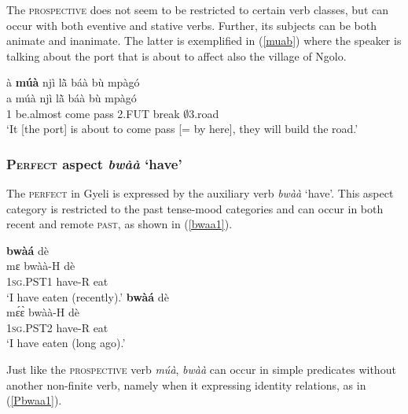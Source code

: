 The \textsc{prospective} does not seem to be restricted to certain verb classes, but can occur with both eventive and stative verbs. Further, its subjects can be both animate and inanimate. The latter is exemplified in (\ref{muab}) where the speaker is talking about the port that is about to affect also the village of Ngolo.

\begin{exe} 
\ex\label{muab}
  \glll à {\bfseries múà} njì lã̀ báà bù mpàgó \\
       a múà njì lã̀ báà bù mpàgó \\
        1 be.almost come pass 2.FUT break $\emptyset$3.road  \\
    \trans `It [the port] is about to come pass [= by here], they will build the road.'
\end{exe}










\subsubsection{\textsc{Perfect} aspect {\itshape bwàà} `have'}
\label{sec:PSTPRF}

The \textsc{perfect} in Gyeli is expressed by the auxiliary verb {\itshape bwàà} `have'. This aspect category is restricted to the past tense-mood categories and can occur in both recent and remote \textsc{past}, as shown in (\ref{bwaa1}).

\begin{exe}  
\ex\label{bwaa1}
\begin{xlist} 
\ex\label{bwaa1a}
   {\bfseries bwàá} dè \\
            mɛ bwàà-H dè \\
             1\textsc{sg}.PST1  have-R eat  \\
    \trans `I have eaten (recently).'
\ex\label{bwaa1b}
   {\bfseries bwàá} dè \\
            mɛ́ɛ̀ bwàà-H dè \\
             1\textsc{sg}.PST2 have-R eat    \\
    \trans `I have eaten (long ago).'
\end{xlist}
\end{exe}

Just like the \textsc{prospective} verb {\itshape múà}, {\itshape bwàà} can occur in simple predicates without another non-finite verb, namely when it expressing identity relations, as in (\ref{Pbwaa1}).


